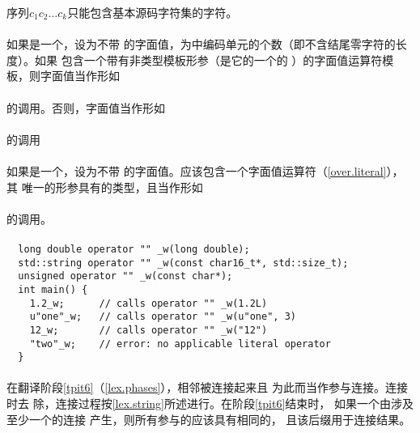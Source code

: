 \begin{note} %
  序列$c_1c_2 \ldots c_k$只能包含基本源码字符集的字符。
\end{note}

\paragraph{} %
如果是一个，设为不带
的字面值，为中编码单元的个数（即不含结尾零字符的长度）。如果
包含一个带有非类型模板形参（是它的一个\wellform{}的
）的字面值运算符模板，则字面值当作形如            \\
\mbox{\qquad{}}                                \\
的调用。否则，字面值当作形如                                            \\
\mbox{\qquad{}}                      \\
的调用

\paragraph{} %
如果是一个，设为不带
的字面值。应该包含一个字面值运算符（\ref{over.literal}），其
唯一的形参具有的类型，且当作形如                                 \\
\mbox{\qquad{}}                                 \\
的调用。

\paragraph{} %
\begin{example} %
  \begin{lstlisting}
  long double operator "" _w(long double);
  std::string operator "" _w(const char16_t*, std::size_t);
  unsigned operator "" _w(const char*);
  int main() {
    1.2_w;      // calls operator "" _w(1.2L)
    u"one"_w;   // calls operator "" _w(u"one", 3)
    12_w;       // calls operator "" _w("12")
    "two"_w;    // error: no applicable literal operator
  }
  \end{lstlisting}
\end{example}

\paragraph{} %
在翻译阶段\ref{tpit6}（\ref{lex.phases}），相邻被连接起来且
为此而当作参与连接。连接时去
除，连接过程按\ref{lex.string}所述进行。在阶段\ref{tpit6}结束时，
如果一个由涉及至少一个的连接
产生，则所有参与的应该具有相同的，
且该后缀用于连接结果。

